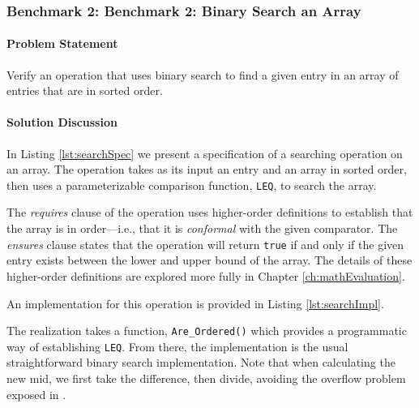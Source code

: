 		\subsubsection{Benchmark 2: Benchmark 2: Binary Search an Array}	%

\paragraph{Problem Statement}Verify an operation that uses binary search to find a given entry in an array of entries that are in sorted order.

\paragraph{Solution Discussion}In Listing \ref{lst:searchSpec} we present a specification of a searching operation on an array.  The operation takes as its input an entry and an array in sorted order, then uses a parameterizable comparison function, \texttt{LEQ}, to search the array.



The \emph{requires} clause of the operation uses higher-order definitions to establish that the array is in order---i.e., that it is \emph{conformal} with the given comparator.  The \emph{ensures} clause states that the operation will return \texttt{true} if and only if the given entry exists between the lower and upper bound of the array.  The details of these higher-order definitions are explored more fully in Chapter \ref{ch:mathEvaluation}.

An implementation for this operation is provided in Listing \ref{lst:searchImpl}.



The realization takes a function, \texttt{Are\_Ordered()} which provides a programmatic way of establishing \texttt{LEQ}.  From there, the implementation is the usual straightforward binary search implementation.  Note that when calculating the new mid, we first take the difference, then divide, avoiding the overflow problem exposed in \cite{thingy}.

